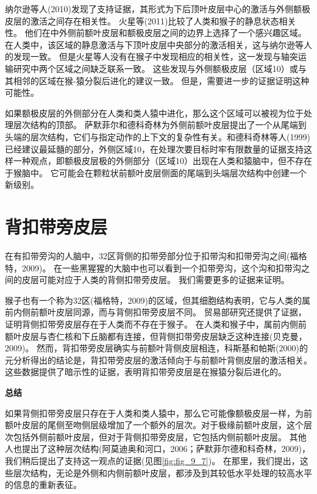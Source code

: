 纳尔逊等人(2010)发现了支持证据，其形式为下后顶叶皮层中心的激活与外侧额极皮层的激活之间存在相关性。
火星等(2011)比较了人类和猴子的静息状态相关性。
他们在中外侧前额叶皮层和额极皮层之间的边界上选择了一个感兴趣区域。
在人类中，该区域的静息激活与下顶叶皮层中央部分的激活相关，这与纳尔逊等人的发现一致。
但是火星等人没有在猴子中发现相应的相关性，这一发现与轴突运输研究中两个区域之间缺乏联系一致。
这些发现与外侧额极皮层（区域10）或与其相邻的区域在猴-猿分裂后进化的建议一致。
但是，需要进一步的证据证明这种可能性。
\par


如果额极皮层的外侧部分在人类和类人猿中进化，那么这个区域可以被视为位于处理层次结构的顶部。
萨默菲尔和德科奇林为外侧前额叶皮层提出了一个从尾端到头端的层次结构，它们与指定动作的上下文的复杂性有关。和德科奇林等人(1999)已经建议最延髓的部分，外侧区域10，在处理次要目标时牢有限数量的证据支持这样一种观点，即额极皮层极的外侧部分（区域10）出现在人类和猿脑中，但不存在于猴脑中。
它可能会在颗粒状前额叶皮层侧面的尾端到头端层次结构中创建一个新级别。



\section{背扣带旁皮层}

在有扣带旁沟的人脑中，32区背侧的扣带旁部分位于扣带沟和扣带旁沟之间(福格特，2009)。
在一些黑猩猩的大脑中也可以看到一个扣带旁沟，这个沟和扣带沟之间的皮层可能对应于人类的背侧扣带旁皮层。
我们需要更多的证据来证明。
\par


猴子也有一个称为32区(福格特，2009)的区域，但其细胞结构表明，它与人类的属前内侧前额叶皮层同源，而与背侧扣带旁皮层不同。
贸易部研究还提供了证据，证明背侧扣带旁皮层存在于人类而不存在于猴子。
在人类和猴子中，属前内侧前额叶皮层与杏仁核和下丘脑都有连接，但背侧扣带旁皮层缺乏这种连接(贝克曼，2009)。
然而，背扣带旁皮层确实与前额叶背侧皮层相连，科斯基和帕斯(2000)的元分析得出的结论是，背扣带旁皮层的激活倾向于与前额叶背侧皮层的激活相关。
这些数据提供了暗示性的证据，表明背扣带旁皮层是在猴猿分裂后进化的。



\textbf{总结}
\par

如果背侧扣带旁皮层只存在于人类和类人猿中，那么它可能像额极皮层一样，为前额叶皮层的尾侧至吻侧层级增加了一个额外的层次。对于极缘前额叶皮层，这个层次包括外侧前额叶皮层，但对于背侧扣带旁皮层，它包括内侧前额叶皮层。
其他人也提出了这种层次结构(阿莫迪奥和河口，2006；萨默菲尔德和科奇林，2009)，我们稍后提出了支持这一观点的证据(见图\ref{fig:fig_9_7})。
在那里，我们提出，这些层次结构，无论是外侧和内侧前额叶皮层，都涉及到其较低水平处理的较高水平的信息的重新表征。
\par



